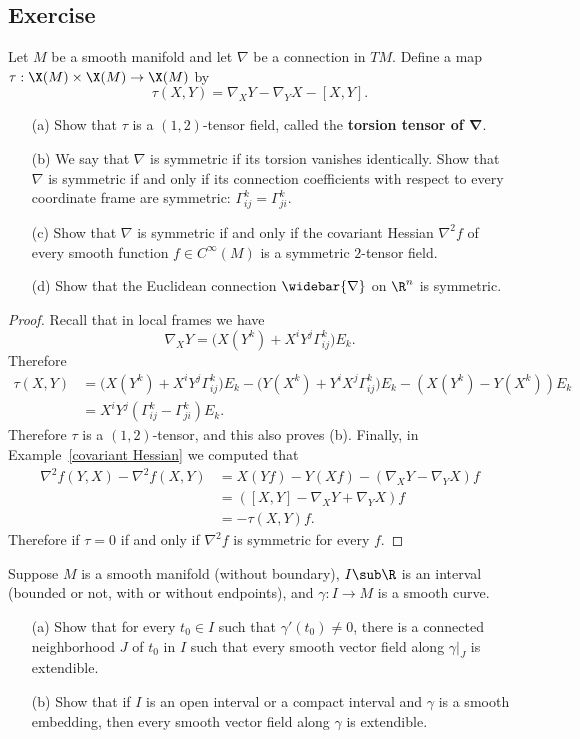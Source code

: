 \subsection{Exercise}
\begin{exercise}\label{connection torsion def}
Let $M$ be a smooth manifold and let $\nabla$ be a connection in $TM$. Define a map $\tau:\X(M)\times\X(M)\to\X(M)$ 
by
\[\tau(X,Y)=\nabla_XY-\nabla_YX-[X,Y].\]
\begin{itemize}
\item[(a)] Show that $\tau$ is a $(1,2)$-tensor field, called the \textbf{torsion tensor of $\bm{\nabla}$}.
\item[(b)] We say that $\nabla$ is symmetric if its torsion vanishes identically. Show that $\nabla$ is symmetric if and only if its connection coefficients with 
respect to every coordinate frame are symmetric: $\Gamma_{ij}^k=\Gamma_{ji}^k$.
\item[(c)] Show that $\nabla$ is symmetric if and only if the covariant Hessian $\nabla^2f$ of every smooth function $f\in C^{\infty}(M)$ is a symmetric $2$-tensor field.
\item[(d)] Show that the Euclidean connection $\widebar{\nabla}$ on $\R^n$ is symmetric. 
\end{itemize}
\end{exercise}
\begin{proof}
Recall that in local frames we have
\[\nabla_XY=\big(X(Y^k)+X^iY^j\Gamma_{ij}^k\big)E_k.\]
Therefore
\begin{align*}
\tau(X,Y)&=\big(X(Y^k)+X^iY^j\Gamma_{ij}^k\big)E_k-\big(Y(X^k)+Y^iX^j\Gamma_{ij}^k\big)E_k-(X(Y^k)-Y(X^k))E_k\\
&=X^iY^j(\Gamma_{ij}^k-\Gamma_{ji}^k)E_k.
\end{align*}
Therefore $\tau$ is a $(1,2)$-tensor, and this also proves (b). Finally, in Example~\ref{covariant Hessian} we computed that
\begin{align*}
\nabla^2f(Y,X)-\nabla^2f(X,Y)&=X(Yf)-Y(Xf)-(\nabla_XY-\nabla_YX)f\\
&=([X,Y]-\nabla_XY+\nabla_YX)f\\
&=-\tau(X,Y)f.
\end{align*}Therefore if $\tau=0$ if and only if $\nabla^2f$ is symmetric for every $f$.
\end{proof}
\begin{exercise}
Suppose $M$ is a smooth manifold (without boundary), $I\sub\R$ is an interval (bounded or not, with or without endpoints), and $\gamma:I\to M$ is a smooth curve.
\begin{itemize}
\item[(a)] Show that for every $t_0\in I$ such that $\gamma'(t_0)\neq 0$, there is a connected neighborhood $J$ of $t_0$ in $I$ such that every smooth vector field 
along $\gamma|_J$ is extendible.
\item[(b)] Show that if $I$ is an open interval or a compact interval and $\gamma$ is a smooth embedding, then every smooth vector field along $\gamma$ is
extendible.
\end{itemize}
\end{exercise}
